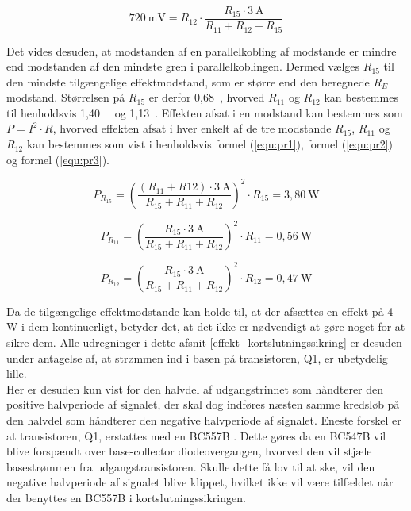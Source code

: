 \begin{equation}
\label{equ:kortslut-betingelse1}
\mathrm{720~mV} = R_{12} \cdot \frac{R_{15} \cdot \mathrm{3~A}}{R_{11} + R_{12} + R_{15}}
\end{equation}

Det vides desuden, at modstanden af en parallelkobling af modstande er mindre end modstanden af den mindste gren i parallelkoblingen. Dermed vælges $R_{15}$ til den mindste tilgængelige effektmodstand, som er større end den beregnede $R_E$ modstand. Størrelsen på $R_{15}$ er derfor 0,68~\ohm, hvorved $R_{11}$ og $R_{12}$ kan bestemmes til henholdsvis 1,40~\ohm~ og 1,13~\ohm. Effekten afsat i en modstand kan bestemmes som $P = I^2 \cdot R$, hvorved effekten afsat i hver enkelt af de tre modstande $R_{15}$, $R_{11}$ og $R_{12}$ kan bestemmes som vist i henholdsvis formel (\ref{equ:pr1}), formel (\ref{equ:pr2}) og formel (\ref{equ:pr3}).

\begin{equation}
\label{equ:pr1}
P_{R_{15}} = \left(\frac{(R_{11} + R{12}) \cdot \mathrm{3~A}}{R_{15} + R_{11} + R_{12}}\right)^2 \cdot R_{15} = \mathrm{3,80~W}
\end{equation}

\begin{equation}
\label{equ:pr2}
P_{R_{11}} = \left(\frac{R_{15} \cdot \mathrm{3~A}}{R_{15} + R_{11} + R_{12}}\right)^2 \cdot R_{11} = \mathrm{0,56~W}
\end{equation}

\begin{equation}
\label{equ:pr3}
P_{R_{12}} = \left(\frac{R_{15} \cdot \mathrm{3~A}}{R_{15} + R_{11} + R_{12}}\right)^2 \cdot R_{12} = \mathrm{0,47~W}
\end{equation}

Da de tilgængelige effektmodstande kan holde til, at der afsættes en effekt på 4 W i dem kontinuerligt, betyder det, at det ikke er nødvendigt at gøre noget for at sikre dem. Alle udregninger i dette afsnit \ref{effekt_kortslutningssikring} er desuden under antagelse af, at strømmen ind i basen på transistoren, Q1, er ubetydelig lille.\\
Her er desuden kun vist for den halvdel af udgangstrinnet som håndterer den positive halvperiode af signalet, der skal dog indføres næsten samme kredsløb på den halvdel som håndterer den negative halvperiode af signalet. Eneste forskel er at transistoren, Q1, erstattes med en BC557B \cite{bc557b-datablad}. Dette gøres da en BC547B vil blive forspændt over base-collector diodeovergangen, hvorved den vil stjæle basestrømmen fra udgangstransistoren. Skulle dette få lov til at ske, vil den negative halvperiode af signalet blive klippet, hvilket ikke vil være tilfældet når der benyttes en BC557B i kortslutningssikringen. 

